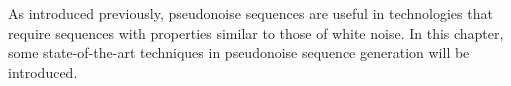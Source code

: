 As introduced previously, pseudonoise sequences are useful in
technologies that require sequences with properties similar to those of white noise. In this
chapter, some state-of-the-art techniques in pseudonoise sequence generation
will be introduced.





